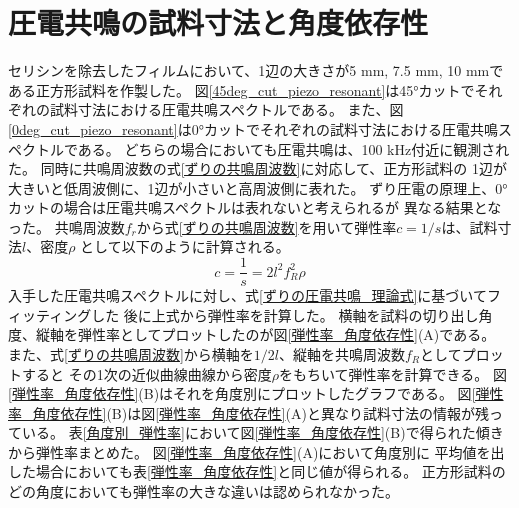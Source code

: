 \documentclass[dvipdfmx,12pt,a4paper]{jreport}
\begin{document}
			\section{圧電共鳴の試料寸法と角度依存性}
			セリシンを除去したフィルムにおいて、1辺の大きさが5 mm, 7.5 mm, 10 mmである正方形試料を作製した。
			図\ref{45deg_cut_piezo_resonant}は45°カットでそれぞれの試料寸法における圧電共鳴スペクトルである。
			また、図\ref{0deg_cut_piezo_resonant}は0°カットでそれぞれの試料寸法における圧電共鳴スペクトルである。
			どちらの場合においても圧電共鳴は、100 kHz付近に観測された。
			同時に共鳴周波数の式\eqref{ずりの共鳴周波数}に対応して、正方形試料の
			1辺が大きいと低周波側に、1辺が小さいと高周波側に表れた。
			ずり圧電の原理上、0°カットの場合は圧電共鳴スペクトルは表れないと考えられるが
			異なる結果となった。
			共鳴周波数$f_r$から式\eqref{ずりの共鳴周波数}を用いて弾性率$c=1/s$は、試料寸法$l$、密度$\rho$
			として以下のように計算される。
			\begin{equation}
				c = \frac{1}{s} = 2l^2 f_R^2 \rho
			\end{equation}
			入手した圧電共鳴スペクトルに対し、式\eqref{ずりの圧電共鳴_理論式}に基づいてフィッティングした
			後に上式から弾性率を計算した。
			横軸を試料の切り出し角度、縦軸を弾性率としてプロットしたのが図\ref{弾性率_角度依存性}(A)である。
			また、式\eqref{ずりの共鳴周波数}から横軸を$1/2l$、縦軸を共鳴周波数$f_R$としてプロットすると
			その1次の近似曲線曲線から密度$\rho$をもちいて弾性率を計算できる。
			図\ref{弾性率_角度依存性}(B)はそれを角度別にプロットしたグラフである。
			図\ref{弾性率_角度依存性}(B)は図\ref{弾性率_角度依存性}(A)と異なり試料寸法の情報が残っている。
			表\ref{角度別_弾性率}において図\ref{弾性率_角度依存性}(B)で得られた傾きから弾性率まとめた。
			図\ref{弾性率_角度依存性}(A)において角度別に
			平均値を出した場合においても表\ref{弾性率_角度依存性}と同じ値が得られる。
			正方形試料のどの角度においても弾性率の大きな違いは認められなかった。
\end{document}
